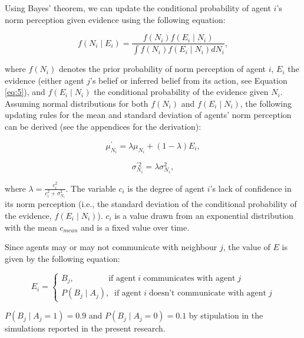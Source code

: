 \documentclass[
  11pt,
]{article}
\begin{document}
Using Bayes' theorem, we can update the conditional probability of agent
\(i\)'s norm perception given evidence using the following equation:

\begin{equation}
\label{eq:2}
f(N_i \mid E_i) = \frac{f(N_i) f(E_i \mid N_i)}{\int f(N_i) f(E_i \mid N_i) dN_i},
\end{equation}

where \(f(N_i)\) denotes the prior probability of norm perception of
agent \(i\), \(E_i\) the evidence (either agent \(j\)'s belief or
inferred belief from its action, see Equation \ref{eq:5}), and
\(f(E_i \mid N_i)\) the conditional probability of the evidence given
\(N_i\). Assuming normal distributions for both \(f(N_i)\) and
\(f(E_i \mid N_i)\), the following updating rules for the mean and
standard deviation of agents' norm perception can be derived (see the
appendices for the derivation):

\begin{equation}
\label{eq:3}
\mu_{N_i}^{\prime} = \lambda \mu_{N_i} + (1 - \lambda) E_i,
\end{equation}

\begin{equation}
\label{eq:4}
\sigma_{N_i}^{\prime2} = \lambda \sigma_{N_i}^2,
\end{equation}

where \(\lambda = \frac{c_i^2}{c_i^2 + \sigma_{N_i}^2}\). The variable
\(c_i\) is the degree of agent \(i\)'s lack of confidence in its norm
perception (i.e., the standard deviation of the conditional probability
of the evidence, \(f(E_i \mid N_i)\)). \(c_i\) is a value drawn from an
exponential distribution with the mean \(c_{mean}\) and is a fixed value
over time.

Since agents may or may not communicate with neighbour \(j\), the value
of \(E\) is given by the following equation:

\begin{equation}
\label{eq:5}
  E_i = \begin{cases}
    B_j, \;\;\;\;\;\;\;\;\;\;\;\;\;\;\; \text{if agent} \; i \; \text{communicates with agent} \; j \\
    P(B_j \mid A_j), \;\; \text{if agent} \; i \; \text{doesn't communicate with agent} \; j
  \end{cases}
\end{equation}

\(P(B_j \mid A_j = 1) = 0.9\) and \(P(B_j \mid A_j = 0) = 0.1\) by
stipulation in the simulations reported in the present research.
\end{document}
